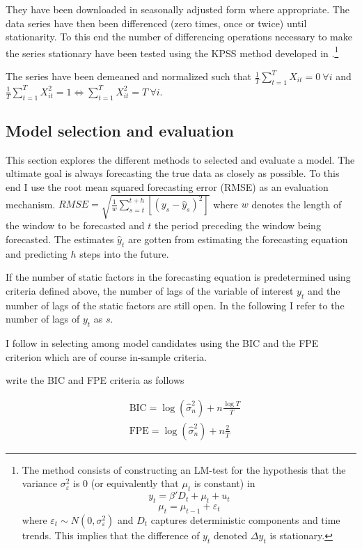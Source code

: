 \documentclass[11pt]{article}
\begin{document}
They have been downloaded in seasonally adjusted form where appropriate. The data series have then been differenced (zero times, once or twice) until stationarity. To this end the number of differencing operations necessary to make the series stationary have been tested using the KPSS method developed in \citet{kwiatkowski1992testing}.\footnote{The method consists of constructing an LM-test for the hypothesis that the variance $\sigma^2_\varepsilon$ is 0 (or equivalently that $\mu_t$ is constant) in $$y_t = \beta'D_t + \mu_t + u_t$$ $$\mu_t = \mu_{t-1} + \varepsilon_t$$ where $\varepsilon_t \sim N(0, \sigma^2_\varepsilon)$ and $D_t$ captures deterministic components and time trends. This implies that the difference of $y_t$ denoted $\Delta y_t$ is stationary.}

The series have been demeaned and normalized such that $\frac{1}{T}\sum_{t=1}^T X_{it} = 0 \ \forall i$ and $\frac{1}{T}\sum_{t=1}^T X_{it}^2 = 1 \Leftrightarrow \sum_{t=1}^T X_{it}^2 = T \ \forall i$. \\


\subsection{Model selection and evaluation}
This section explores the different methods to selected and evaluate a model. The ultimate goal is always forecasting the true data as closely as possible. To this end I use the root mean squared forecasting error (RMSE) as an evaluation mechanism. $RMSE = \sqrt{\frac{1}{w}\sum_{s=t}^{t+h}[(y_s - \hat y_s)^2]}$ where $w$ denotes the length of the window to be forecasted and $t$ the period preceding the window being forecasted. The estimates $\hat y_t$ are gotten from estimating the forecasting equation and predicting $h$ steps into the future.

If the number of static factors in the forecasting equation is predetermined using criteria defined above, the number of lags of the variable of interest $y_t$ and the number of lags of the static factors are still open. In the following I refer to the number of lags of $y_t$ as $s$. 

I follow \citet{bai2008forecasting} in selecting among model candidates using the BIC and the FPE criterion which are of course in-sample criteria. 

\citet{bai2008forecasting} write the BIC and FPE criteria as follows

\begin{equation}
\label{information criteria}
\begin{split}
	& \text{BIC} = \log(\hat \sigma_n^2) + n \frac{\log T}{T} \\ 
	& \text{FPE} = \log(\hat \sigma_n^2) + n \frac{2}{T}
\end{split}
\end{equation}
\end{document}
